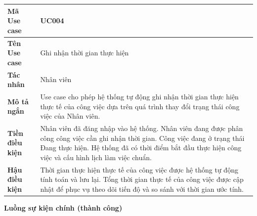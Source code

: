 \documentclass[../DoAn.tex]{subfiles}
\begin{document}
{\ucTableText
\begin{longtable}{|>{\columncolor{ucLabelBg}\bfseries}p{}|p{}|}
\hline
Mã Use case & UC004 \\ \hline
Tên Use case & Ghi nhận thời gian thực hiện \\ \hline
Tác nhân & Nhân viên \\ \hline
Mô tả ngắn & Use case cho phép hệ thống tự động ghi nhận thời gian thực hiện thực tế của công việc dựa trên quá trình thay đổi trạng thái công việc của Nhân viên. \\ \hline
Tiền điều kiện & Nhân viên đã đăng nhập vào hệ thống. Nhân viên đang được phân công công việc cần ghi nhận thời gian. Công việc đang ở trạng thái Đang thực hiện. Hệ thống đã có thời điểm bắt đầu thực hiện công việc và cấu hình lịch làm việc chuẩn. \\ \hline
Hậu điều kiện & Thời gian thực hiện thực tế của công việc được hệ thống tự động tính toán và lưu lại. Tổng thời gian thực tế của công việc được cập nhật để phục vụ theo dõi tiến độ và so sánh với thời gian ước tính. \\ \hline
\end{longtable}
}

\textbf{Luồng sự kiện chính (thành công)}
\end{document}
